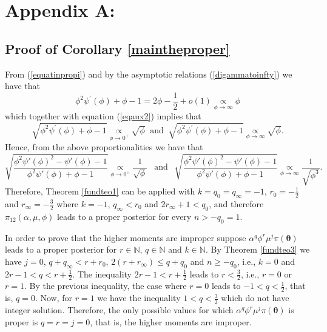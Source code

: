 \documentclass[]{interact}
\newcommand{\N}{\mathbb{N}}
\newcommand{\bs}{\boldsymbol}
\theoremstyle{plain}%
\theoremstyle{definition}
\theoremstyle{remark}
\begin{document}
\section{Appendix A:}

\subsection{Proof of Corollary \ref{maintheproper}}\label{ccorolamab3}

From (\ref{equatinpropi}) and by the asymptotic relations (\ref{digammatoinfty}) we have that 
\begin{equation*}
\phi^2\psi^{'}(\phi)+\phi-1 =2\phi-\frac{1}{2}+o\left(1\right) \underset{\phi\to \infty}{\propto} \phi
\end{equation*}
which together with equation (\ref{eqaux2}) implies that
\begin{equation*}
\sqrt{\phi^2\psi^{'}(\phi)+\phi-1}\underset{\phi\to 0^{+}}{\propto}  \sqrt{\phi}\ \mbox{ and }\ \sqrt{\phi^2\psi^{'}(\phi)+\phi-1}\underset{\phi\to \infty}{\propto} \sqrt{\phi}.
\end{equation*}
Hence, from the above proportionalities we have that
\begin{equation*}
\sqrt{\frac{\phi^2\psi'(\phi)^2-\psi'(\phi)-1}{\phi^2\psi'(\phi)+\phi-1}} \underset{\phi\to 0^{+}}{\propto}\frac{1}{\sqrt{\phi}} \ \ \mbox{ and } \ \ \sqrt{\frac{\phi^2\psi'(\phi)^2-\psi'(\phi)-1}{\phi^2\psi'(\phi)+\phi-1}} \underset{\phi\to \infty}{\propto} \frac{1}{\sqrt{\phi^3}}.
\end{equation*}
Therefore, Theorem \ref{fundteo1} can be applied with $k= q_0 = q_\infty = -1$, $r_0 = -\frac{1}{2}$ and $r_\infty= -\frac{3}{2}$ where $k=-1$, $q_\infty < r_0$ and $2r_\infty+1 < q_0$, and therefore $\pi_{12}(\alpha,\mu,\phi)$ leads to a proper posterior for every $n> -q_0 = 1$.

In order to prove that the higher moments are improper suppose  $\alpha^q\phi^r\mu^j\pi(\bs{\theta})$ leads to a proper posterior for $r\in\N$, $q\in\N$ and $k\in\N$. By Theorem \ref{fundteo3} we have $j= 0$, $q+q_\infty<r+r_0$, $2(r+r_\infty) \leq q+q_0$ and $n\geq -q_0$, i.e., $k=0$ and $2r-1< q< r+\frac{1}{2}$. The inequality $2r-1<r+\frac{1}{2}$ leads to $r<\frac{3}{2}$, i.e., $r=0$ or $r=1$. By the previous inequality, the case where $r=0$ leads to $-1<q<\frac{1}{2}$, that is, $q=0$. Now, for $r=1$ we have the inequality $1<q<\frac{3}{2}$ which do not have integer solution. Therefore, the only possible values for which $\alpha^q\phi^r\mu^j\pi(\bs{\theta})$ is proper is $q=r=j=0$, that is, the higher moments are improper. 

\vspace{1cm}
\end{document}
